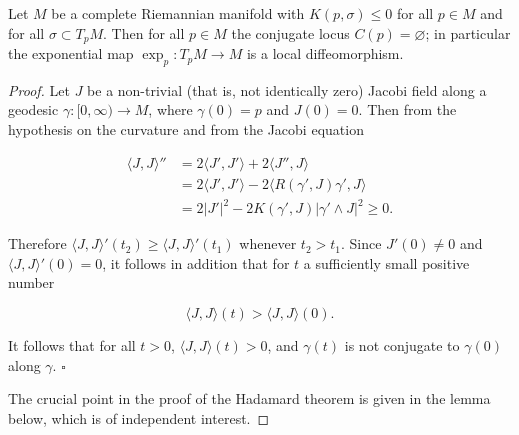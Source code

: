 \begin{lemma}
  \label{lem:dc-ch7-3-2}
  Let $M$ be a complete Riemannian manifold with $K(p,\sigma)\le 0$ for all $p\in M$
  and for all $\sigma\subset T_pM$. Then for all $p\in M$ the conjugate locus
  $C(p)=\varnothing$; in particular the exponential map $\exp_p:T_pM\to M$ is a local
  diffeomorphism.
\end{lemma}
\begin{proof}
  Let $J$ be a non-trivial (that is, not identically zero) Jacobi field
  along a geodesic $\gamma:[0,\infty)\to M$, where $\gamma(0)=p$ and $J(0)=0$. Then
  from the hypothesis on the curvature and from the Jacobi equation
  
  $$
  \begin{aligned}
  \langle J,J\rangle''&=2\langle J',J'\rangle+2\langle J'',J\rangle\\
  &=2\langle J',J'\rangle-2\langle R(\gamma',J)\gamma',J\rangle\\
  &=2|J'|^2-2K(\gamma',J)|\gamma'\wedge J|^2\ge 0.
  \end{aligned}
  $$
  
  Therefore $\langle J,J\rangle'(t_2)\ge\langle J,J\rangle'(t_1)$ whenever
  $t_2>t_1$. Since $J'(0)\ne 0$ and $\langle J,J\rangle'(0)=0$, it follows in
  addition that for $t$ a sufficiently small positive number
  
  $$
  \langle J,J\rangle(t)>\langle J,J\rangle(0).
  $$
  
  It follows that for all $t>0$, $\langle J,J\rangle(t)>0$, and $\gamma(t)$ is not
  conjugate to $\gamma(0)$ along $\gamma$. $\square$
  
  The crucial point in the proof of the Hadamard theorem is given in the lemma
  below, which is of independent interest.
\end{proof}

